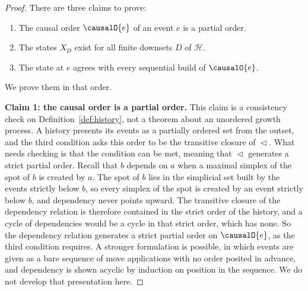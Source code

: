 \begin{proof}
There are three claims to prove:
\begin{enumerate}
  \item The causal order $\causalO{e}$ of an event $e$ is a partial order.
  \item The states $X_D$ exist for all finite downsets $D$ of $\mathcal{H}$.
  \item The state at $e$ agrees with every sequential build of $\causalO{e}$.
\end{enumerate}
We prove them in that order.

\medskip
\noindent\textbf{Claim 1: the causal order is a partial order.}
This claim is a consistency check on Definition~\ref{def:history}, not a theorem about an unordered growth process.
A history presents its events as a partially ordered set from the outset, and the third condition asks this order to be the transitive closure of $\vartriangleleft$.
What needs checking is that the condition can be met, meaning that $\vartriangleleft$ generates a strict partial order.
Recall that $b$ depends on $a$ when a maximal simplex of the spot of $b$ is created by $a$.
The spot of $b$ lies in the simplicial set built by the events strictly below $b$, so every simplex of the spot is created by an event strictly below $b$, and dependency never points upward.
The transitive closure of the dependency relation is therefore contained in the strict order of the history, and a cycle of dependencies would be a cycle in that strict order, which has none.
So the dependency relation generates a strict partial order on $\causalO{e}$, as the third condition requires.
A stronger formulation is possible, in which events are given as a bare sequence of move applications with no order posited in advance, and dependency is shown acyclic by induction on position in the sequence.
We do not develop that presentation here.


\end{proof}
